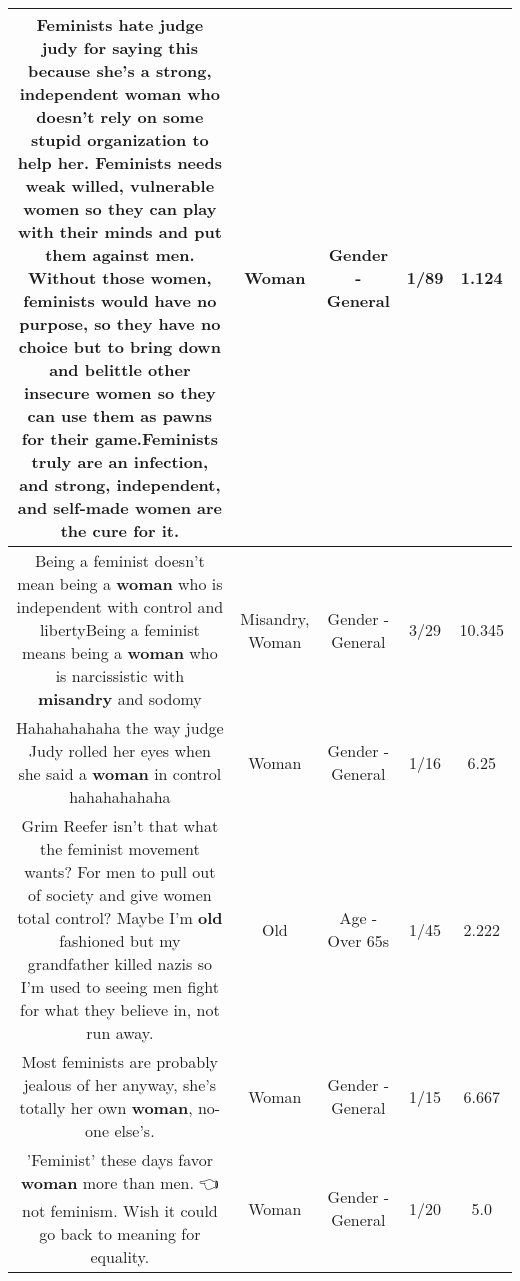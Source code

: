 \documentclass[11pt]{article}
\newlength\mylength
\begin{document}
\begin{center}
\begin{longtable}{|C{.65\mylength}|C{.30\mylength}|C{.12\mylength}|C{.12\mylength}|C{.12\mylength}|}
  \small Feminists hate judge judy for saying this because she's a strong, independent \textbf{woman} who doesn't rely on some stupid organization to help her. Feminists needs weak willed, vulnerable women so they can play with their minds and put them against men. Without those women, feminists would have no purpose, so they have no choice but to bring down and belittle other insecure women so they can use them as pawns for their game.Feminists truly are an infection, and strong, independent, and self-made women are the cure for it.\normalsize   & Woman & Gender - General & 1/89 & 1.124 \\  \hline
  \small Being a feminist doesn't mean being a \textbf{woman} who is independent with control and libertyBeing a feminist means being a \textbf{woman} who is narcissistic with \textbf{misandry} and sodomy\normalsize   & Misandry, Woman & Gender - General & 3/29 & 10.345 \\  \hline
  \small Hahahahahaha the way judge Judy rolled her eyes when she said a \textbf{woman} in control hahahahahaha\normalsize   & Woman & Gender - General & 1/16 & 6.25 \\  \hline
  \small Grim Reefer isn't that what the feminist movement wants? For men to pull out of society and give women total control? Maybe I'm \textbf{old} fashioned but my grandfather killed nazis so I'm used to seeing men fight for what they believe in, not run away.\normalsize   & Old & Age - Over 65s & 1/45 & 2.222 \\  \hline
  \small Most feminists are probably jealous of her anyway, she's totally her own \textbf{woman}, no-one else's.\normalsize   & Woman & Gender - General & 1/15 & 6.667 \\  \hline
  \small 'Feminist' these days favor \textbf{woman} more than men. 👈 not feminism. Wish it could go back to meaning for equality.\normalsize   & Woman & Gender - General & 1/20 & 5.0 \\  \hline

\end{longtable}
\end{center}
\end{document}
